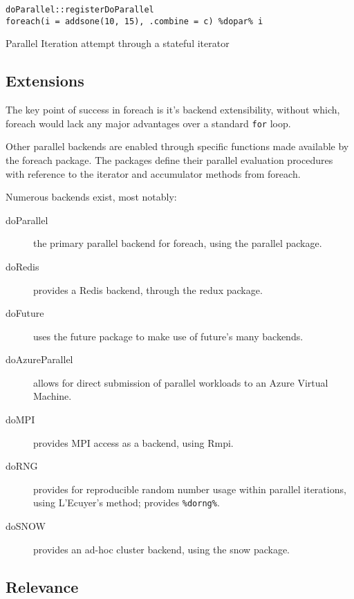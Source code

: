 \documentclass[a4paper,10pt]{article}
\begin{document}
\begin{listing}
\begin{verbatim}
doParallel::registerDoParallel
foreach(i = addsone(10, 15), .combine = c) %dopar% i
\end{verbatim}
\caption{Parallel Iteration attempt through a stateful iterator}\label{src:parallel-iter}
\end{listing}

\subsection{Extensions}
\label{sec:extensions}

The key point of success in foreach is it's backend extensibility,
without which, foreach would lack any major advantages over a standard
\texttt{for} loop.

Other parallel backends are enabled through specific functions made
available by the foreach package. The packages define their parallel
evaluation procedures with reference to the iterator and accumulator
methods from foreach.

Numerous backends exist, most notably:
\begin{description}
	\item[doParallel] the primary parallel backend for foreach, using the
	      parallel package\cite{corporation19}.
	\item[doRedis]  provides a Redis backend, through the redux package\cite{lewis20}.
	\item[doFuture] uses the future package to make use of future's many
	      backends\cite{bengtsson20do}.
	\item[doAzureParallel] allows for direct submission of parallel
	      workloads to an Azure Virtual Machine\cite{hoang20}.
	\item[doMPI] provides MPI access as a backend, using Rmpi\cite{weston17}.
	\item[doRNG] provides for reproducible random number usage within
	      parallel iterations, using L'Ecuyer's method; provides
	      \texttt{\%dorng\%}\cite{gaujoux20}.
	\item[doSNOW] provides an ad-hoc cluster backend, using the snow
	      package\cite{dosnow19}.
\end{description}

\subsection{Relevance}
\label{sec:relevance}
\end{document}
